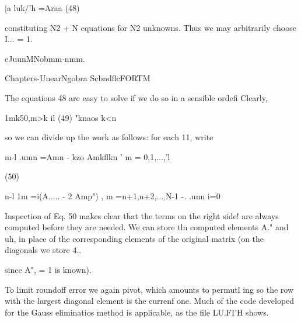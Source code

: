 [a luk/'h =Araa (48)

constituting N2 + N equations for N2 unknowns. Thus we may
arbitrarily choose I... = 1.

eJuunMNobmm-nmm.

Chapters-UnearNgobra ScbndflcFORTM

The equations 48 are easy to solve if we do so in a sensible ordefi
Clearly,

1mk50,m>k il
(49)
"knaos k<n

so we can divide up the work as follows: for each 11, write

 

 

m-l
.umn =Amn - kzo Amkflkn ' m = 0,1,...,'l

(50)

n-l
1m =i(A..... - 2 Amp") , m =n+1,n+2,...,N-1 -.
.unn i=0

 

Inspection of Eq. 50 makes clear that the terms on the right side!
are always computed before they are needed. We can store tln
computed elements A." and uh, in place of the corresponding
elements of the original matrix (on the diagonals we store  4..

since A", = 1 is known).

To limit roundoff error we again pivot, which amounts to permutl
ing so the row with the largest diagonal element is the currenf
one. Much of the code developed for the Gauss eliminatios
method is applicable, as the file LU.FI'H shows.

